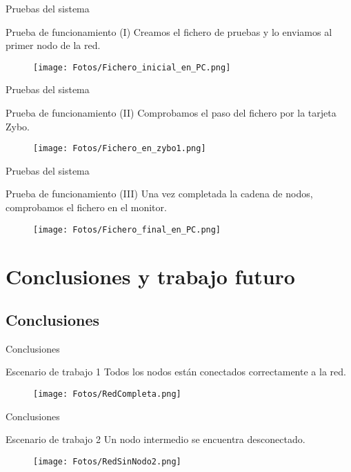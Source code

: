 \documentclass[aspectratio=169]{beamer}
\begin{document}
\begin{frame}{Pruebas del sistema}
\begin{block}{Prueba de funcionamiento (I)}
	Creamos el fichero de pruebas y lo enviamos al primer nodo de la red.
	\begin{figure}[h]
		\centering
		\texttt{[image: Fotos/Fichero\_inicial\_en\_PC.png]}
	\end{figure}
\end{block}
\end{frame}

\begin{frame}{Pruebas del sistema}
\begin{block}{Prueba de funcionamiento (II)}
	Comprobamos el paso del fichero por la tarjeta Zybo.
	\begin{figure}[h]
		\centering
		\texttt{[image: Fotos/Fichero\_en\_zybo1.png]}
	\end{figure}
\end{block}
\end{frame}

\begin{frame}{Pruebas del sistema}
\begin{block}{Prueba de funcionamiento (III)}
	Una vez completada la cadena de nodos, comprobamos el fichero en el monitor.
	\begin{figure}[h]
		\centering
		\texttt{[image: Fotos/Fichero\_final\_en\_PC.png]}
	\end{figure}
\end{block}
\end{frame}

\section{Conclusiones y trabajo futuro}
\subsection{Conclusiones}
\begin{frame}{Conclusiones}
\begin{block}{Escenario de trabajo 1}
	Todos los nodos están conectados correctamente a la red.
	\begin{figure}[h]
		\centering
		\texttt{[image: Fotos/RedCompleta.png]}
	\end{figure}
\end{block}
\end{frame}

\begin{frame}{Conclusiones}
\begin{block}{Escenario de trabajo 2}
	Un nodo intermedio se encuentra desconectado.
	\begin{figure}[h]
		\centering
		\texttt{[image: Fotos/RedSinNodo2.png]}
	\end{figure}
\end{block}
\end{frame}
\end{document}
